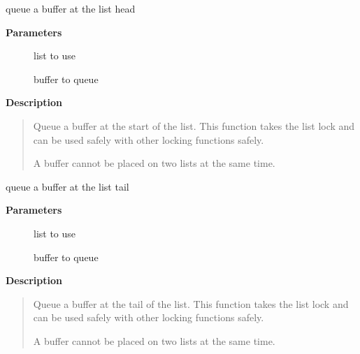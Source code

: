 \documentclass[a4paper,8pt,english]{sphinxmanual}
\begin{document}
\begin{fulllineitems}
queue a buffer at the list head

\end{fulllineitems}


\textbf{Parameters}
\begin{description}
\item[{}] \leavevmode
list to use

\item[{}] \leavevmode
buffer to queue

\end{description}

\textbf{Description}
\begin{quote}

Queue a buffer at the start of the list. This function takes the
list lock and can be used safely with other locking {\hyperref[networking/kapi:c.sk_buff]{\emph{}}} functions
safely.

A buffer cannot be placed on two lists at the same time.
\end{quote}

\begin{fulllineitems}
queue a buffer at the list tail

\end{fulllineitems}


\textbf{Parameters}
\begin{description}
\item[{}] \leavevmode
list to use

\item[{}] \leavevmode
buffer to queue

\end{description}

\textbf{Description}
\begin{quote}

Queue a buffer at the tail of the list. This function takes the
list lock and can be used safely with other locking {\hyperref[networking/kapi:c.sk_buff]{\emph{}}} functions
safely.

A buffer cannot be placed on two lists at the same time.
\end{quote}
\end{document}
